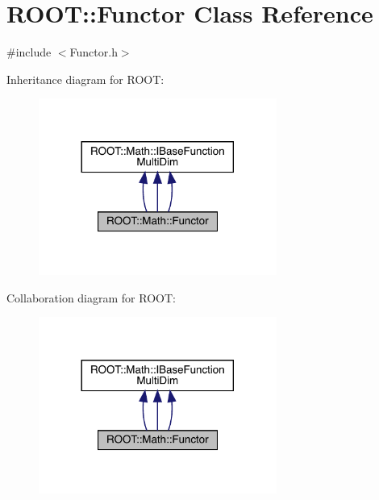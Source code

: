 \hypertarget{classROOT_1_1Math_1_1Functor}{}\section{R\+O\+OT\+:\+:Functor Class Reference}
\label{classROOT_1_1Math_1_1Functor}


{\ttfamily \#include $<$Functor.\+h$>$}



Inheritance diagram for R\+O\+OT\+:
\nopagebreak
\begin{figure}[H]
\begin{center}
\leavevmode
\includegraphics[width=221pt]{dd/d90/classROOT_1_1Math_1_1Functor__inherit__graph}
\end{center}
\end{figure}


Collaboration diagram for R\+O\+OT\+:
\nopagebreak
\begin{figure}[H]
\begin{center}
\leavevmode
\includegraphics[width=221pt]{da/d07/classROOT_1_1Math_1_1Functor__coll__graph}
\end{center}
\end{figure}
